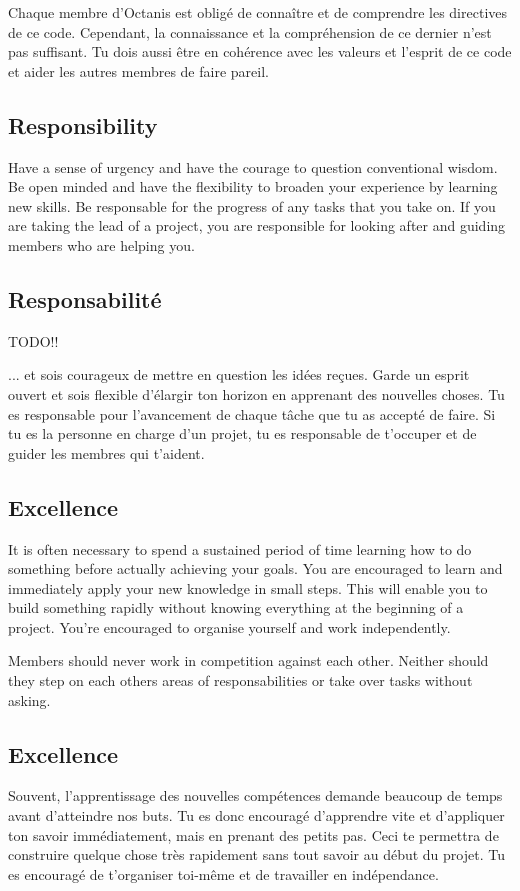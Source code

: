 	Chaque membre d'Octanis est obligé de connaître et de comprendre les directives de ce code.
	Cependant, la connaissance et la compréhension de ce dernier n'est pas suffisant. Tu dois aussi être en cohérence avec les valeurs et l'esprit de ce code et aider les autres membres de faire pareil.



	
\english
	\subsection{Responsibility}
	Have a sense of urgency and have the courage to question conventional wisdom. Be open minded and have the flexibility to broaden your experience by learning new skills. Be responsable for the progress of any tasks that you take on. If you are taking the lead of a project, you are responsible for looking after and guiding members who are helping you.



\french
	\subsection{Responsabilité}

	TODO!!

	... et sois courageux de mettre en question les idées reçues. Garde un esprit ouvert et sois flexible d'élargir ton horizon en apprenant des nouvelles choses. Tu es responsable pour l'avancement de chaque tâche que tu as accepté de faire. Si tu es la personne en charge d'un projet, tu es responsable de t'occuper et de guider les membres qui t'aident. 

\english
	\subsection{Excellence}
 	It is often necessary to spend a sustained period of time learning how to do something before actually achieving your goals. You are encouraged to learn and immediately apply your new knowledge in small steps. This will enable you to build something rapidly without knowing everything at the beginning of a project. You're encouraged to organise yourself and work independently. 
 	

	Members should never work in competition against each other. Neither should they step on each others areas of responsabilities or take over tasks without asking.




\french
	\subsection{Excellence}
	Souvent, l'apprentissage des nouvelles compétences demande beaucoup de temps avant d'atteindre nos buts. Tu es donc encouragé d'apprendre vite et d'appliquer ton savoir immédiatement, mais en prenant des petits pas. Ceci te permettra de construire quelque chose très rapidement sans tout savoir au début du projet. Tu es encouragé de t'organiser toi-même et de travailler en indépendance. 

